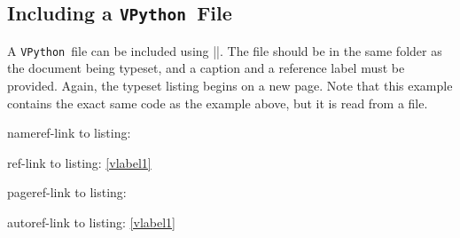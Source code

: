 \documentclass{article}
\newcommand*{\VPython}{\texttt{VPython}}              %
\begin{document}
\subsection{Including a \VPython\ File}
A \VPython\ file can be included using ||. The file 
should be in the same folder as the document being typeset, and a caption and a reference 
label must be provided. Again, the typeset listing begins on a new page. Note that this
example contains the exact same code as the example above, but it is read from a file.


nameref-link to listing: 

ref-link to listing: \ref{vlabel1}

pageref-link to listing: \pageref{vlabel1}

autoref-link to listing: \autoref{vlabel1}
\end{document}
